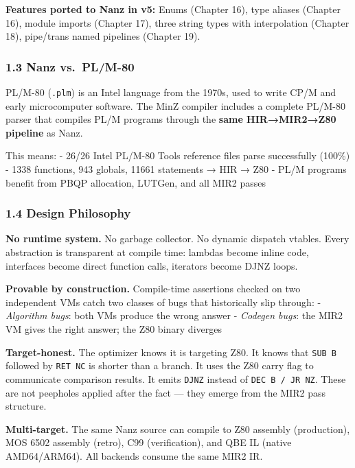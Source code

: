\documentclass[
  11pt,
]{article}
\begin{document}
\textbf{Features ported to Nanz in v5:} Enums (Chapter 16), type aliases
(Chapter 16), module imports (Chapter 17), three string types with
interpolation (Chapter 18), pipe/trans named pipelines (Chapter 19).

\hypertarget{nanz-vs.-plm-80}{%
\subsubsection{1.3 Nanz vs.~PL/M-80}\label{nanz-vs.-plm-80}}

PL/M-80 (\texttt{.plm}) is an Intel language from the 1970s, used to
write CP/M and early microcomputer software. The MinZ compiler includes
a complete PL/M-80 parser that compiles PL/M programs through the
\textbf{same HIR→MIR2→Z80 pipeline} as Nanz.

This means: - 26/26 Intel PL/M-80 Tools reference files parse
successfully (100\%) - 1338 functions, 943 globals, 11661 statements →
HIR → Z80 - PL/M programs benefit from PBQP allocation, LUTGen, and all
MIR2 passes

\hypertarget{design-philosophy}{%
\subsubsection{1.4 Design Philosophy}\label{design-philosophy}}

\textbf{No runtime system.} No garbage collector. No dynamic dispatch
vtables. Every abstraction is transparent at compile time: lambdas
become inline code, interfaces become direct function calls, iterators
become DJNZ loops.

\textbf{Provable by construction.} Compile-time assertions checked on
two independent VMs catch two classes of bugs that historically slip
through: - \emph{Algorithm bugs}: both VMs produce the wrong answer -
\emph{Codegen bugs}: the MIR2 VM gives the right answer; the Z80 binary
diverges

\textbf{Target-honest.} The optimizer knows it is targeting Z80. It
knows that \texttt{SUB\ B} followed by \texttt{RET\ NC} is shorter than
a branch. It uses the Z80 carry flag to communicate comparison results.
It emits \texttt{DJNZ} instead of \texttt{DEC\ B\ /\ JR\ NZ}. These are
not peepholes applied after the fact --- they emerge from the MIR2 pass
structure.

\textbf{Multi-target.} The same Nanz source can compile to Z80 assembly
(production), MOS 6502 assembly (retro), C99 (verification), and QBE IL
(native AMD64/ARM64). All backends consume the same MIR2 IR.
\end{document}
